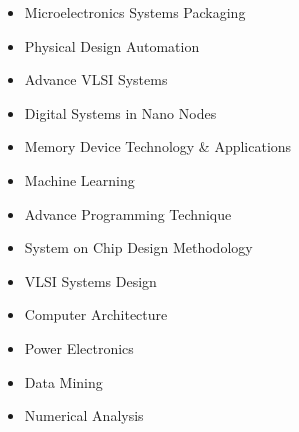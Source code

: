 
    
 
   
 
\vspace{5pt}

   
\vspace{5pt}


\begin{itemize}
\item Microelectronics Systems Packaging
\item Physical Design Automation
\item Advance VLSI Systems
\item Digital Systems in Nano Nodes
\item Memory Device Technology \& Applications
\item Machine Learning
\item Advance Programming Technique
\end{itemize}

\vspace{-5pt}
\divider

\begin{itemize}
\item System on Chip Design Methodology
\item VLSI Systems Design
\item Computer Architecture
\item Power Electronics
\item Data Mining
\item Numerical Analysis
\end{itemize}


